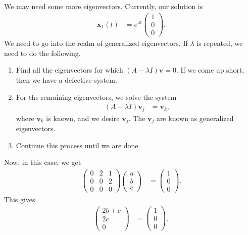 \documentclass[10pt]{mypackage}
\begin{document}
\begin{example}
\begin{align*}
  \end{align*}
  We may need some more eigenvectors. Currently, our solution is
  \begin{align*}
    \mathbf{x}_1(t) &= e^{4t} \begin{pmatrix}1\\0\\0\end{pmatrix}.
  \end{align*}
  We need to go into the realm of generalized eigenvectors. If $\lambda$ is repeated, we need to do the following.
  \begin{enumerate}[(1)]
    \item Find all the eigenvectors for which $\left( A - \lambda I \right)\mathbf{v} = 0$. If we come up short, then we have a defective system.
    \item For the remaining eigenvectors, we solve the system
      \begin{align*}
        \left( A - \lambda I \right)\mathbf{v}_j &= \mathbf{v}_k,
      \end{align*}
      where $\mathbf{v}_k$ is known, and we desire $\mathbf{v}_j$. The $\mathbf{v}_j$ are known as generalized eigenvectors.
    \item Continue this process until we are done. 
  \end{enumerate}
  Now, in this case, we get
  \begin{align*}
    \begin{pmatrix}0 & 2 & 1 \\ 0 & 0 & 2 \\ 0 & 0 & 0\end{pmatrix} \begin{pmatrix}a\\b\\c\end{pmatrix} &= \begin{pmatrix}1\\0\\0\end{pmatrix}.
  \end{align*}
  This gives
  \begin{align*}
    \begin{pmatrix}2b + c \\ 2c \\ 0\end{pmatrix} &= \begin{pmatrix}1\\0\\0\end{pmatrix},

\end{align*}
\end{example}
\end{document}
